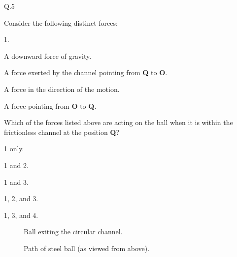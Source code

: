     \begin{mcq}{Q.5}{Consider the following distinct forces:

        \eline[]
        \begin{options}{1.}
            \item A downward force of gravity.
            \item A force exerted by the channel pointing from \textbf{Q} to \textbf{O}.
            \item A force in the direction of the motion.
            \item A force pointing from \textbf{O} to \textbf{Q}.
        \end{options}
        \eline[]

        Which of the forces listed above are acting on the ball when it is within the frictionless channel at the position \textbf{Q}?
    }

        \item 1 only.
        \item 1 and 2.
        \item 1 and 3.
        \item 1, 2, and 3.
        \item 1, 3, and 4.
    \end{mcq}

    \newpage    %
%

    \begin{figure}[h!]
        \begin{center}
            
            \caption{\label{fig:channel_exit} Ball exiting the circular channel.}
        \end{center}
    \end{figure}


    \begin{figure}[h!]
        \begin{center}
            
            \caption{\label{fig:whirling_ball} Path of steel ball (as viewed from above).}
        \end{center}
    \end{figure}


